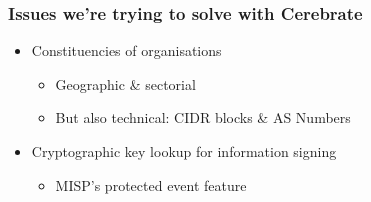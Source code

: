 \begin{frame}
\frametitle{Issues we're trying to solve with Cerebrate}
    \begin{minipage}{0.8\textwidth}
        \begin{itemize}
            \item Constituencies of organisations
            \begin{itemize}
                \item Geographic \& sectorial
                \item But also technical: CIDR blocks \& AS Numbers
            \end{itemize}
            \item Cryptographic key lookup for information signing
            \begin{itemize}
                \item MISP's protected event feature
            \end{itemize}
        \end{itemize}
    \end{minipage}
    \begin{minipage}{0.19\textwidth}

\end{minipage}
\end{frame}
